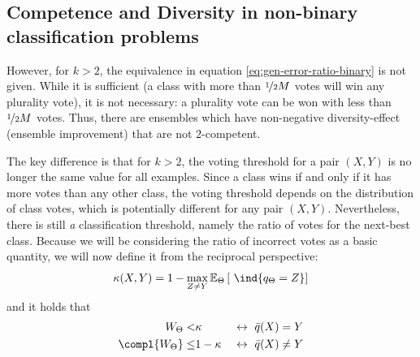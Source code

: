 \documentclass[../main.tex]{subfiles}
\begin{document}
\subsection{Competence and Diversity in non-binary classification problems}
\label{sec:k-competence}
However, for $k>2$, the equivalence in equation \ref{eq:gen-error-ratio-binary} is not given. While it is sufficient (a class with more than $\nicefrac{1}{2}M$ votes will win any plurality vote), it is not necessary: a plurality vote can be won with less than $\nicefrac{1}{2}M$ votes. Thus, there are ensembles which have non-negative diversity-effect (ensemble improvement) that are not $2$-competent. %

The key difference is that for $k>2$, the voting threshold for a pair $(X,Y)$ is no longer the same value for all examples. Since a class wins if and only if it has more votes than any other class, the voting threshold depends on the distribution of class votes, which is potentially different for any pair $(X,Y)$. Nevertheless, there is still \textit{a} classification threshold, namely the ratio of votes for the next-best class. Because we will be considering the ratio of incorrect votes as a basic quantity, we will now define it from the reciprocal perspective:
$$
\kappa (X,Y) = 1 - \max_{Z \not= Y} \mathbb{E}_{\Theta}\left[ ~\ind{q_{\Theta} = Z} \right] 
$$
and it holds that
$$
\begin{align}
W_{\Theta} <& \kappa  & ~\leftrightarrow~ \bar{q}(X) = Y \\ 
\compl{W_{\Theta}} \leq& 1-\kappa  & ~\leftrightarrow~ \bar{q}(X) \not= Y
\end{align}
$$
\end{document}
